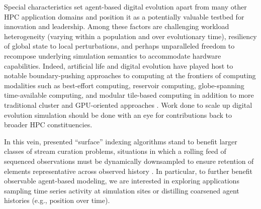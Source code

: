 Special characteristics set agent-based digital evolution apart from many other HPC application domains and position it as a potentially valuable testbed for innovation and leadership.
Among these factors are challenging workload heterogeneity (varying within a population and over evolutionary time), resiliency of global state to local perturbations, and perhaps unparalleled freedom to recompose underlying simulation semantics to accommodate hardware capabilities.
Indeed, artificial life and digital evolution have played host to notable boundary-pushing approaches to computing at the frontiers of computing modalities such as best-effort computing, reservoir computing, globe-spanning time-available computing, and modular tile-based computing in addition to more traditional cluster and GPU-oriented approaches \citep{moreno2021conduit,ackley2020best,ackley2023robust,heinemann2008artificial,miikkulainen2024evolving}.
Work done to scale up digital evolution simulation should be done with an eye for contributions back to broader HPC constituencies.



In this vein, presented ``surface'' indexing algorithms stand to benefit larger classes of stream curation problems, situations in which a rolling feed of sequenced observations must be dynamically downsampled to ensure retention of elements representative across observed history \citep{streamcurationpreprint}.
In particular, to further benefit observable agent-based modeling, we are interested in exploring applications sampling time series activity at simulation sites or distilling coarsened agent histories (e.g., position over time).

